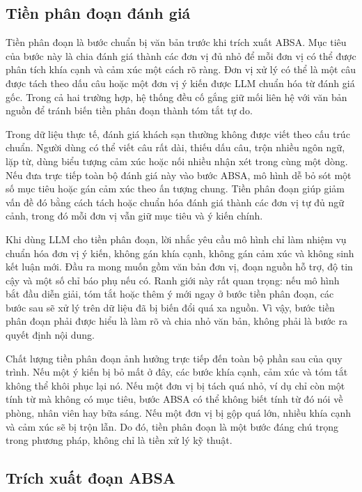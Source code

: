 \documentclass[12pt,a4paper]{report}
\begin{document}
\subsection{Tiền phân đoạn đánh giá}

Tiền phân đoạn là bước chuẩn bị văn bản trước khi trích xuất ABSA. Mục tiêu của bước này là chia đánh giá thành các đơn vị đủ nhỏ để mỗi đơn vị có thể được phân tích khía cạnh và cảm xúc một cách rõ ràng. Đơn vị xử lý có thể là một câu được tách theo dấu câu hoặc một đơn vị ý kiến được LLM chuẩn hóa từ đánh giá gốc. Trong cả hai trường hợp, hệ thống đều cố gắng giữ mối liên hệ với văn bản nguồn để tránh biến tiền phân đoạn thành tóm tắt tự do.

Trong dữ liệu thực tế, đánh giá khách sạn thường không được viết theo cấu trúc chuẩn. Người dùng có thể viết câu rất dài, thiếu dấu câu, trộn nhiều ngôn ngữ, lặp từ, dùng biểu tượng cảm xúc hoặc nối nhiều nhận xét trong cùng một dòng. Nếu đưa trực tiếp toàn bộ đánh giá này vào bước ABSA, mô hình dễ bỏ sót một số mục tiêu hoặc gán cảm xúc theo ấn tượng chung. Tiền phân đoạn giúp giảm vấn đề đó bằng cách tách hoặc chuẩn hóa đánh giá thành các đơn vị tự đủ ngữ cảnh, trong đó mỗi đơn vị vẫn giữ mục tiêu và ý kiến chính.

Khi dùng LLM cho tiền phân đoạn, lời nhắc yêu cầu mô hình chỉ làm nhiệm vụ chuẩn hóa đơn vị ý kiến, không gán khía cạnh, không gán cảm xúc và không sinh kết luận mới. Đầu ra mong muốn gồm văn bản đơn vị, đoạn nguồn hỗ trợ, độ tin cậy và một số chỉ báo phụ nếu có. Ranh giới này rất quan trọng: nếu mô hình bắt đầu diễn giải, tóm tắt hoặc thêm ý mới ngay ở bước tiền phân đoạn, các bước sau sẽ xử lý trên dữ liệu đã bị biến đổi quá xa nguồn. Vì vậy, bước tiền phân đoạn phải được hiểu là làm rõ và chia nhỏ văn bản, không phải là bước ra quyết định nội dung.

Chất lượng tiền phân đoạn ảnh hưởng trực tiếp đến toàn bộ phần sau của quy trình. Nếu một ý kiến bị bỏ mất ở đây, các bước khía cạnh, cảm xúc và tóm tắt không thể khôi phục lại nó. Nếu một đơn vị bị tách quá nhỏ, ví dụ chỉ còn một tính từ mà không có mục tiêu, bước ABSA có thể không biết tính từ đó nói về phòng, nhân viên hay bữa sáng. Nếu một đơn vị bị gộp quá lớn, nhiều khía cạnh và cảm xúc sẽ bị trộn lẫn. Do đó, tiền phân đoạn là một bước đáng chú trọng trong phương pháp, không chỉ là tiền xử lý kỹ thuật.

\subsection{Trích xuất đoạn ABSA}
\end{document}

